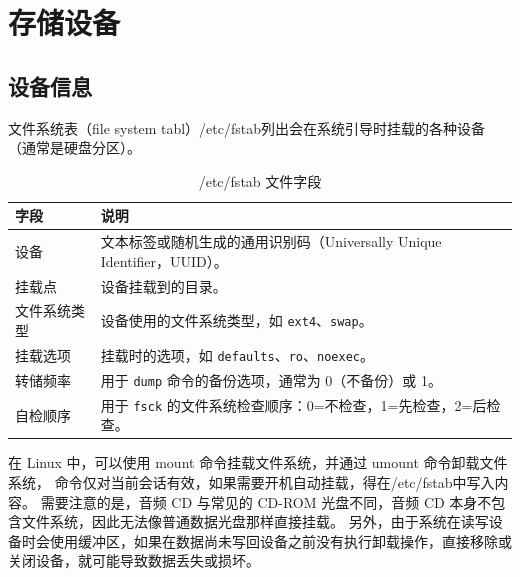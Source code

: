 \section{存储设备}
\subsection{设备信息}
文件系统表（file system tabl）/etc/fstab列出会在系统引导时挂载的各种设备（通常是硬盘分区）。
\begin{table}[H]
	\centering
	\begin{tabular}{|l|l|}
		\hline
		\textbf{字段} & \textbf{说明}                                          \\
		\hline
		设备          & 文本标签或随机生成的通用识别码（Universally Unique Identifier，UUID）。 \\
		\hline
		挂载点         & 设备挂载到的目录。                                            \\
		\hline
		文件系统类型      & 设备使用的文件系统类型，如 \verb|ext4|、\verb|swap|。               \\
		\hline
		挂载选项        & 挂载时的选项，如 \verb|defaults|、\verb|ro|、\verb|noexec|。    \\
		\hline
		转储频率        & 用于 \verb|dump| 命令的备份选项，通常为 0（不备份）或 1。                \\
		\hline
		自检顺序        & 用于 \verb|fsck| 的文件系统检查顺序：0=不检查，1=先检查，2=后检查。          \\
		\hline
	\end{tabular}
	\caption{/etc/fstab 文件字段}
\end{table}

在 Linux 中，可以使用 mount 命令挂载文件系统，并通过 umount 命令卸载文件系统，
命令仅对当前会话有效，如果需要开机自动挂载，得在/etc/fstab中写入内容。
需要注意的是，音频 CD 与常见的 CD-ROM 光盘不同，音频 CD 本身不包含文件系统，因此无法像普通数据光盘那样直接挂载。
另外，由于系统在读写设备时会使用缓冲区，如果在数据尚未写回设备之前没有执行卸载操作，直接移除或关闭设备，就可能导致数据丢失或损坏。

